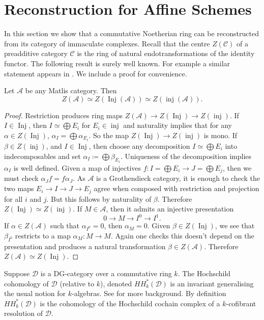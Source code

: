 \documentclass[12pt,oneside]{amsart}
\DeclareMathOperator*{\Inj}{Inj}
\DeclareMathOperator{\inj}{inj}
\begin{document}
\section{Reconstruction for Affine Schemes}
\label{reconstructionsec}

In this section we show that a commutative Noetherian ring can be reconstructed from its category of immaculate complexes. Recall that the centre $Z(\mathcal{C})$ of a preadditive category $\mathcal{C}$ is the ring of natural endotransformations of the identity functor. The following result is surely well known. For example a similar statement appears in \cite[Theorem 6.9]{AS22}. We include a proof for convenience.


\begin{lemma} \label{centreiscentre}
Let $\mathcal{A}$ be any Matlis category. Then
\[
Z(\mathcal{A}) \simeq Z(\Inj(\mathcal{A})) \simeq Z(\inj(\mathcal{A})).
\]
\end{lemma}

\begin{proof}
Restriction produces ring maps $Z(\mathcal{A}) \to Z(\Inj) \to Z(\inj)$. If $I \in \Inj$, then $I \simeq \bigoplus E_i$ for $E_i \in \inj$ and naturality implies that for any $\alpha \in Z(\Inj)$, $\alpha_{I} = \bigoplus \alpha_{E_i}$. So the map $Z(\Inj) \to Z(\inj)$ is mono. If $\beta \in Z(\inj)$, and $I \in \Inj$, then choose any decomposition $I \simeq \bigoplus E_i$ into indecomposables and set $\alpha_I \coloneq \bigoplus \beta_{E_i}$. Uniqueness of the decomposition implies $\alpha_I$ is well defined. Given a map of injectives $f: I = \bigoplus E_i \to J = \bigoplus E_j$, then we must check $\alpha_J f = f \alpha_J$. As $\mathcal{A}$ is a Grothendieck category, it is enough to check the two maps $E_i \to I \to J \to E_j$ agree when composed with restriction and projection for all $i$ and $j$. But this follows by naturality of $\beta$. Therefore $Z(\Inj) \simeq Z(\inj)$. If $M \in \mathcal{A}$, then it admits an injective presentation
\[
0 \to M \to I^0 \to I^1.
\]
If $\alpha \in Z(\mathcal{A})$ such that $\alpha_{I^0} = 0$, then $\alpha_{M} = 0$. Given $\beta \in Z(\Inj)$, we see that $\beta_{I^0}$ restricts to a map $\alpha_M: M \to M$. Again one checks this doesn't depend on the presentation and produces a natural transformation $\beta \in Z(\mathcal{A})$. Therefore $Z(\mathcal{A}) \simeq Z(\Inj)$. 
\end{proof}

\begin{remark} Suppose $\mathcal{D}$ is a DG-category over a commutative ring $k$. The Hochschild cohomology of $\mathcal{D}$ (relative to $k$), denoted $HH^\ast_k(\mathcal{D})$ is an invariant generalising the usual notion for $k$-algebras. See \cite{LVdB05} for more background. By definition $HH^\ast_k(\mathcal{D})$ is the cohomology of the Hochschild cochain complex of a $k$-cofibrant resolution of $\mathcal{D}$. 
\end{remark}
\end{document}
